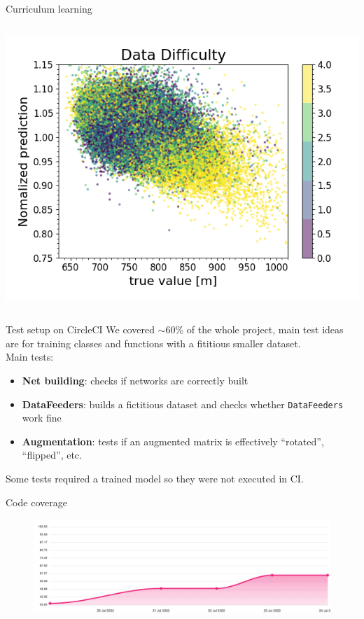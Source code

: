 \documentclass{beamer}
\begin{document}
\begin{frame}{Curriculum learning}
\begin{columns}
\begin{column}{.5\textwidth}
            \includegraphics[width=\textwidth]{figures/curriculum_after.png}
        \end{column}
    \end{columns}
\end{frame}


\begin{frame}{Test setup on CircleCI}
We covered $\sim 60\%$ of the whole project, main test ideas are for training classes and functions with a fititious
smaller dataset.\\
Main tests:
\begin{itemize}
    \item[\textbullet] \textbf{Net building}: checks if networks are correctly built
    \item[\textbullet] \textbf{DataFeeders}: builds a fictitious dataset and checks whether \texttt{DataFeeders} work fine
    \item[\textbullet] \textbf{Augmentation}: tests if an augmented matrix is effectively ``rotated'', ``flipped'', etc.
\end{itemize}
    \vfill
    Some tests required a trained model so they were not executed in CI.
\end{frame}
\begin{frame}{Code coverage}
\begin{figure}
    \centering
    \includegraphics[width=\textwidth]{figures/dabyfosy.png}
\end{figure}

\end{frame}
\end{document}
